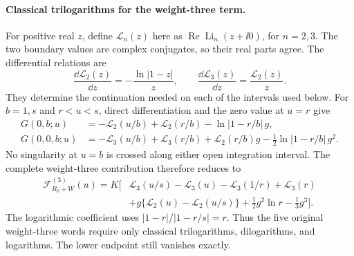 \paragraph{Classical trilogarithms for the weight-three term.}
For positive real $z$, define $\mathcal L_n(z)$ here as
$\operatorname{Re}\operatorname{Li}_n(z+\ii0)$, for $n=2,3$.
The two boundary values are complex conjugates, so their real parts agree.
The differential relations are
\begin{equation}
 \frac{\dd\mathcal L_2(z)}{\dd z}=-\frac{\ln|1-z|}{z},
 \qquad
 \frac{\dd\mathcal L_3(z)}{\dd z}=\frac{\mathcal L_2(z)}{z}.
\end{equation}
They determine the continuation needed on each of the intervals used below.
For $b=1,s$ and $r<u<s$, direct differentiation and the zero value at $u=r$
give
\begin{align}
 G(0,b;u)&=-\mathcal L_2(u/b)+\mathcal L_2(r/b)
                      -\ln|1-r/b|\,g,\\
 G(0,0,b;u)&=-\mathcal L_3(u/b)+\mathcal L_3(r/b)
       +\mathcal L_2(r/b)g-\tfrac12\ln|1-r/b|\,g^2.
\end{align}
No singularity at $u=b$ is crossed along either open integration interval.
The complete weight-three contribution therefore reduces to
\begin{align}
 \mathcal F^{(3)}_{R_0+W}(u)=K\bigl[&
 \mathcal L_3(u/s)-\mathcal L_3(u)
 -\mathcal L_3(1/r)+\mathcal L_3(r)\\
 &+g\{\mathcal L_2(u)-\mathcal L_2(u/s)\}
 +\tfrac12g^2\ln r-\tfrac13g^3\bigr].
 \label{eq:comp-real-classical-weight-three}
\end{align}
The logarithmic coefficient uses
$|1-r|/|1-r/s|=r$. Thus the five original weight-three words require
only classical trilogarithms, dilogarithms, and logarithms. The lower
endpoint still vanishes exactly.

